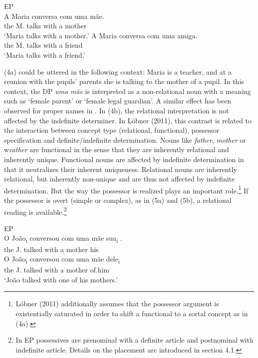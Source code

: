 \documentclass[output=paper]{langsci/langscibook}
\begin{document}
\ea%
    EP\label{ex:wein:4}\\
    \ea 
    \gll A Maria conversa com uma mãe.\\
         the M. talks with a mother\\
    \glt ‘Maria talks with a mother.’
    \ex  
    \gll A Maria conversa com uma amiga.\\
         the M. talks with a friend\\
    \glt ‘Maria talks with a friend.’
    \z
\z

(4a) could be uttered in the following context: Maria is a teacher, and at a reunion with the pupils’ parents she is talking to the mother of a pupil. In this context, the DP \textit{uma mãe} is interpreted as a non-relational noun with a meaning such as ‘female parent’ or ‘female legal guardian’. A similar effect has been observed for proper names in \citet{Longobardi1994}. In (4b), the relational interpretation is not affected by the indefinite determiner. In Löbner (2011), this contrast is related to the interaction between concept type (relational, functional), possessor specification and definite/indefinite determination. Nouns like \textit{father}, \textit{mother} or w\textit{eather} are functional in the sense that they are inherently relational and inherently unique. Functional nouns are affected by indefinite determination in that it neutralizes their inherent uniqueness. Relational nouns are inherently relational, but inherently non-unique and are thus not affected by indefinite determination. But the way the possessor is realized plays an important role.\footnote{Löbner (2011) additionally assumes that the possessor argument is existentially saturated in order to shift a functional to a sortal concept as in (4a).} If the possessor is overt (simple or complex), as in (5a) and (5b), a relational reading is available.\footnote{In EP possessives are prenominal with a definite article and postnominal with indefinite article. Details on the placement are introduced in section 4.1.}

\ea%
    EP\label{ex:wein:5}\\
    \ea
    \gll O João\textsubscript{i} conversou com uma mãe sua\textsubscript{i} .  \\
         the J.   talked   with a mother his\\
    \ex  
    \gll O João\textsubscript{i} conversou com uma mãe dele\textsubscript{i} \\
         the J. talked    with a mother of.him \\
    \glt ‘João talked with one of his mothers.’ 
    \z
\z
\end{document}
